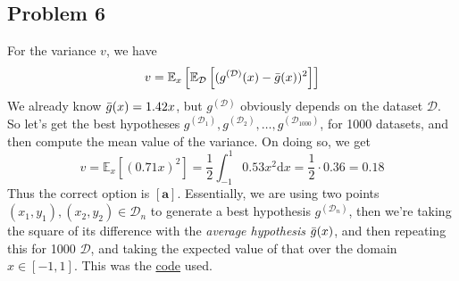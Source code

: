\documentclass{article}
\begin{document}
\subsection*{Problem 6}
For the variance $v$, we have
\begin{equation*}
    v = \mathbb{E}_{x}\left[\mathbb{E}_{\mathcal{D}}\left[(g^{\mathcal{(D)}}(x) - \Bar{g}(x))^{2}\right]\right]
\end{equation*}
We already know $\Bar{g}(x) = 1.42x$, but $g^{(\mathcal{D})}$ obviously depends on the dataset $\mathcal{D}$. So let's get the best hypotheses $g^{(\mathcal{D}_1)}, g^{(\mathcal{D}_2)}, \dots, g^{(\mathcal{D}_{1000})}$, for 1000 datasets, and then compute the mean value of the variance. On doing so, we get
\begin{equation*}
    v = \mathbb{E}_{x}\left[(0.71x)^{2}\right] = \frac{1}{2}\int_{-1}^{1}0.53x^2\text{d}x = \frac{1}{2}\cdot 0.36 = 0.18
\end{equation*}
Thus the correct option is $[\textbf{a}]$. Essentially, we are using two points $(x_{1}, y_{1}), (x_{2}, y_{2}) \in \mathcal{D}_{n}$ to generate a best hypothesis $g^{(\mathcal{D}_{n})}$, then we're taking the square of its difference with the \emph{average hypothesis} $\Bar{g}(x)$, and then repeating this for 1000 $\mathcal{D}$, and taking the expected value of that over the domain $x \in [-1,1]$. This was the \hyperref[prob6]{code} used.
\end{document}
